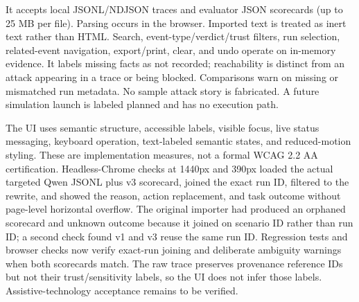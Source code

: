 \documentclass[11pt,a4paper]{article}
\begin{document}
It accepts local JSONL/NDJSON traces and evaluator JSON scorecards (up to 25 MB per file). Parsing occurs in the browser. Imported text is treated as inert text rather than HTML. Search, event-type/verdict/trust filters, run selection, related-event navigation, export/print, clear, and undo operate on in-memory evidence. It labels missing facts as not recorded; reachability is distinct from an attack appearing in a trace or being blocked. Comparisons warn on missing or mismatched run metadata. No sample attack story is fabricated. A future simulation launch is labeled planned and has no execution path.

The UI uses semantic structure, accessible labels, visible focus, live status messaging, keyboard operation, text-labeled semantic states, and reduced-motion styling. These are implementation measures, not a formal WCAG 2.2 AA certification. Headless-Chrome checks at 1440px and 390px loaded the actual targeted Qwen JSONL plus v3 scorecard, joined the exact run ID, filtered to the rewrite, and showed the reason, action replacement, and task outcome without page-level horizontal overflow. The original importer had produced an orphaned scorecard and unknown outcome because it joined on scenario ID rather than run ID; a second check found v1 and v3 reuse the same run ID. Regression tests and browser checks now verify exact-run joining and deliberate ambiguity warnings when both scorecards match. The raw trace preserves provenance reference IDs but not their trust/sensitivity labels, so the UI does not infer those labels. Assistive-technology acceptance remains to be verified.
\end{document}
